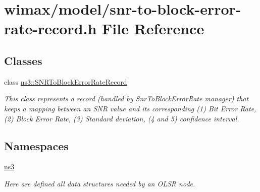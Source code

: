 \hypertarget{snr-to-block-error-rate-record_8h}{}\section{wimax/model/snr-\/to-\/block-\/error-\/rate-\/record.h File Reference}
\label{snr-to-block-error-rate-record_8h}
\subsection*{Classes}
\begin{DoxyCompactItemize}
\item 
class \hyperlink{classns3_1_1SNRToBlockErrorRateRecord}{ns3\+::\+S\+N\+R\+To\+Block\+Error\+Rate\+Record}
\begin{DoxyCompactList}\small\item\em This class represents a record (handled by Snr\+To\+Block\+Error\+Rate manager) that keeps a mapping between an S\+NR value and its corresponding (1) Bit Error Rate, (2) Block Error Rate, (3) Standard deviation, (4 and 5) confidence interval. \end{DoxyCompactList}\end{DoxyCompactItemize}
\subsection*{Namespaces}
\begin{DoxyCompactItemize}
\item 
 \hyperlink{namespacens3}{ns3}
\begin{DoxyCompactList}\small\item\em Here are defined all data structures needed by an O\+L\+SR node. \end{DoxyCompactList}\end{DoxyCompactItemize}
